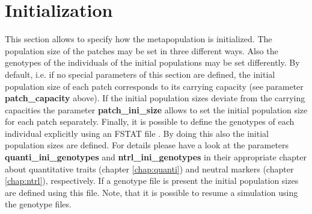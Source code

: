 \documentclass[letterpaper,12pt,oneside]{book}
\begin{document}
\section{Initialization}
This section allows to specify how the metapopulation is initialized. The population size of the patches may be set in three different ways. Also the genotypes of the individuals of the initial populations may be set differently. By default, i.e. if no special parameters of this section are defined, the initial population size of each patch corresponds to its carrying capacity (see parameter \textbf{patch\_capacity} above). If the initial population sizes deviate from the carrying capacities the parameter \textbf{patch\_ini\_size} allows to set the initial population size for each patch separately. Finally, it is possible to define the genotypes of each individual explicitly using an FSTAT file \citep{Goudet_1995}. By doing this also the initial population sizes are defined. For details please have a look at the parameters \textbf{quanti\_ini\_genotypes} and \textbf{ntrl\_ini\_genotypes} in their appropriate chapter about quantitative traits (chapter \ref{chap:quanti}) and neutral markers (chapter \ref{chap:ntrl}), respectively. If a genotype file is present the initial population sizes are defined using this file. Note, that it is possible to resume a simulation using the genotype files.    
\end{document}
